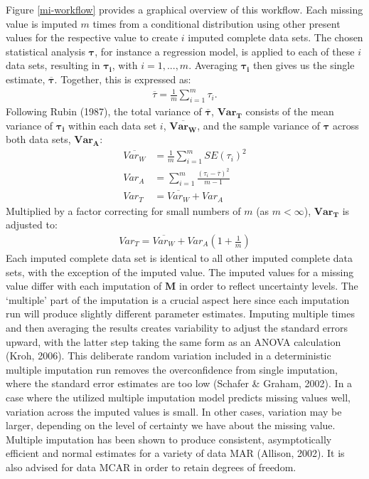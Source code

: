 \documentclass[12pt,econ]{sources/authesis}
\begin{document}
Figure \ref{mi-workflow} provides a graphical overview of this workflow. Each missing value is imputed \(m\) times from a conditional distribution using other present values for the respective value to create \(i\) imputed complete data sets. The chosen statistical analysis \(\bm{\tau}\), for instance a regression model, is applied to each of these \(i\) data sets, resulting in \(\bm{\tau_{i}}\), with \(i = 1, ..., m\). Averaging \(\bm{\tau_{i}}\) then gives us the single estimate, \(\bm{\overline{\tau}}\). Together, this is expressed as:
\begin{align}
\overline{\tau} = \frac{1}{m}\sum\limits_{i=1}^{m} \tau_{i}.
\end{align}
Following Rubin (1987), the total variance of \(\bm{\overline{\tau}}\), \(\bm{Var_T}\) consists of the mean variance of \(\bm{\tau_i}\) within each data set \(i\), \(\bm{\overline{Var_W}}\), and the sample variance of \(\bm{\tau}\) across both data sets, \(\bm{Var_A}\):
\begin{align}
\overline{Var_W} &= \frac{1}{m} \sum\limits_{i=1}^{m} SE(\tau_i)^2\\
Var_A &= \sum\limits_{i=1}^{m} \frac{(\tau_{i} - \overline{\tau})^2}{m -1}\\
Var_T &= \overline{Var_W} + Var_A
\end{align}
Multiplied by a factor correcting for small numbers of \(m\) (as \(m < \infty\)), \(\bm{Var_T}\) is adjusted to:
\begin{align}
Var_T = \overline{Var_W} + Var_A (1 + \frac{1}{m})
\end{align}
Each imputed complete data set is identical to all other imputed complete data sets, with the exception of the imputed value. The imputed values for a missing value differ with each imputation of \(\bm{M}\) in order to reflect uncertainty levels. The `multiple' part of the imputation is a crucial aspect here since each imputation run will produce slightly different parameter estimates. Imputing multiple times and then averaging the results creates variability to adjust the standard errors upward, with the latter step taking the same form as an ANOVA calculation (Kroh, 2006). This deliberate random variation included in a deterministic multiple imputation run removes the overconfidence from single imputation, where the standard error estimates are too low (Schafer \& Graham, 2002). In a case where the utilized multiple imputation model predicts missing values well, variation across the imputed values is small. In other cases, variation may be larger, depending on the level of certainty we have about the missing value. Multiple imputation has been shown to produce consistent, asymptotically efficient and normal estimates for a variety of data MAR (Allison, 2002). It is also advised for data MCAR in order to retain degrees of freedom.
\end{document}
